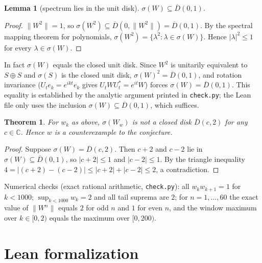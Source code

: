 \documentclass[11pt]{article}
\newtheorem{theorem}{Theorem}
\newtheorem{lemma}{Lemma}
\theoremstyle{definition}
\begin{document}
\begin{lemma}[spectrum lies in the unit disk]
$\sigma(W)\subseteq\overline{D}(0,1)$.
\end{lemma}
\begin{proof}
$\|W^2\|=1$, so $\sigma(W^2)\subseteq\overline{D}(0,\|W^2\|)=\overline{D}(0,1)$.
By the spectral mapping theorem for polynomials, $\sigma(W^2)=\{\lambda^2:\lambda\in\sigma(W)\}$.
Hence $|\lambda|^2\le 1$ for every $\lambda\in\sigma(W)$.
\end{proof}

In fact $\sigma(W)$ equals the closed unit disk. Since $W^2$ is unitarily equivalent to $S\oplus S$ and
$\sigma(S)$ is the closed unit disk, $\sigma(W)^2=\overline{D}(0,1)$, and rotation invariance
($U_t e_k=e^{ikt}e_k$ gives $U_tWU_t^*=e^{it}W$) forces $\sigma(W)=\overline{D}(0,1)$.
This equality is established by the analytic argument printed in \texttt{check.py}; the Lean file
only uses the inclusion $\sigma(W)\subseteq\overline{D}(0,1)$, which suffices.

\begin{theorem}
For $w_k$ as above, $\sigma(W_w)$ is not a closed disk $\overline{D}(c,2)$ for any $c\in\mathbb{C}$.
Hence $w$ is a counterexample to the conjecture.
\end{theorem}
\begin{proof}
Suppose $\sigma(W)=\overline{D}(c,2)$. Then $c+2$ and $c-2$ lie in $\sigma(W)\subseteq\overline{D}(0,1)$,
so $|c+2|\le 1$ and $|c-2|\le 1$. By the triangle inequality
$4=|(c+2)-(c-2)|\le |c+2|+|c-2|\le 2$, a contradiction.
\end{proof}

Numerical checks (exact rational arithmetic, \texttt{check.py}): all $w_kw_{k+1}=1$ for $k<1000$;
$\sup_{k<1000}w_k=2$ and all tail suprema are $2$; for $n=1,\dots,60$ the exact value of $\|W^n\|$ equals
$2$ for odd $n$ and $1$ for even $n$, and the window maximum over $k\in[0,2)$ equals the maximum over $[0,200)$.

\section{Lean formalization}
\end{document}
